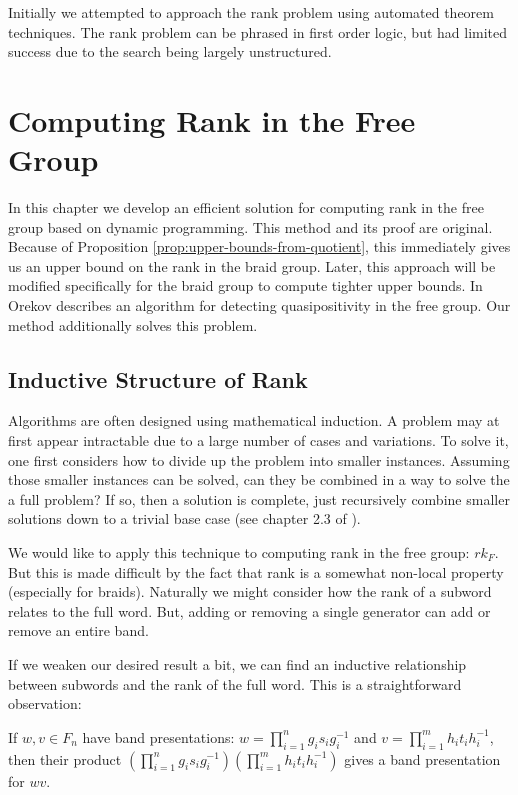 \documentclass[12pt]{thesis}
\begin{document}
Initially we attempted to approach the rank problem
using automated theorem techniques. The rank problem can be phrased
in first order logic, but had limited success due to the search
being largely unstructured.

\fi

\chapter{Computing Rank in the Free Group}

\label{chap:free-rank}

In this chapter we develop an efficient solution for computing rank 
in the free group based on dynamic programming.
This method and its proof are original. 
Because of Proposition \ref{prop:upper-bounds-from-quotient},
this immediately gives us an upper bound on the rank in the braid group.
Later, this approach will be modified specifically for the braid group to compute tighter
upper bounds.
In \cite{quasipositive-3-braids} Orekov describes
an algorithm for detecting quasipositivity in the free group.
Our method additionally solves this problem.

\section{Inductive Structure of Rank}

Algorithms are often designed using mathematical induction.  
A problem may at first appear intractable due to a large number of cases and variations.
To solve it, one first considers how to divide up the problem into smaller instances.
Assuming those smaller instances can be solved, can they be combined in a way to solve the a full problem?
If so, then a solution is complete, just recursively combine smaller solutions
down to a trivial base case (see chapter 2.3 of \cite{clrs}).

We would like to apply this technique to computing rank in the free group: $rk_{F}$.
But this is made difficult by the fact that rank is a somewhat non-local property (especially for braids).
Naturally we might consider how  the rank of a subword relates to the full word.
But, adding or removing a single generator can add
or remove an entire band. 

If we weaken our desired result a bit, we can find an inductive relationship between 
subwords and the rank of the full word.
This is a straightforward observation:

\begin{proposition}
    If $w, v \in F_{n}$ have band presentations:
    $w = \prod_{i=1}^{n} g_{i} s_{i} g_{i}^{-1}$
    and $v = \prod_{i=1}^{m} h_{i} t_{i} h_{i}^{-1}$,
    then their product $(\prod_{i=1}^{n} g_{i} s_{i} g_{i}^{-1}) (\prod_{i=1}^{m} h_{i} t_{i} h_{i}^{-1})$
    gives a band presentation for $wv$.
\end{proposition}
\end{document}
